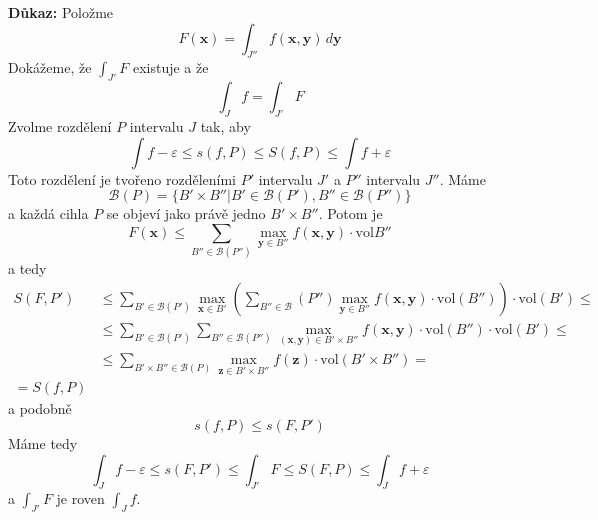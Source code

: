 \documentclass[../main.tex]{subfiles}
\begin{document}
\vspace{5mm}
\noindent
\textbf{Důkaz:}
Položme
\[ F(\mathbf{x}) = \int_{J''} f(\mathbf{x}, \mathbf{y}) \,d\mathbf{y} \]
Dokážeme, že $\int_{J'} F$ existuje a že
\[ \int_{J} f = \int_{J'} F \]
Zvolme rozdělení $P$ intervalu $J$ tak, aby
\[ \int f - \varepsilon \leq s(f,P) \leq S(f,P) \leq \int f + \varepsilon \]
Toto rozdělení je tvořeno rozděleními $P'$ intervalu $J'$ a $P''$ intervalu $J''$. Máme
\[ \mathcal{B}(P) = \{ B' \times B'' | B' \in \mathcal{B}(P'), B'' \in \mathcal{B}(P'') \} \]
a každá cihla $P$ se objeví jako právě jedno $B' \times B''$. Potom je
\[ F(\mathbf{x}) \leq \sum_{B''\in \mathcal{B}(P'')}
\max_{\mathbf{y} \in B''} f(\mathbf{x}, \mathbf{y}) \cdot \textrm{vol}B'' \]
a tedy
\begin{align*}
    S(F, P')
    &\leq \sum_{B' \in \mathcal{B}(P')} \max_{\mathbf{x}\in B'}
    \left( \sum_{B'' \in \mathcal{B}}(P'') \max_{\mathbf{y}\in B''}
    f(\mathbf{x}, \mathbf{y}) \cdot \textrm{vol}(B'')\right) \cdot \textrm{vol}(B') \leq\\
    &\leq \sum_{B' \in \mathcal{B}(P')} \sum_{B'' \in \mathcal{B}(P'')}
    \max_{(\mathbf{x}, \mathbf{y}) \in B' \times B''} f(\mathbf{x}, \mathbf{y})
    \cdot \textrm{vol}(B'') \cdot \textrm{vol}(B') \leq\\
    &\leq \sum_{B' \times B'' \in \mathcal{B}(P)} \max_{\mathbf{z}\in B' \times B''}
    f(\mathbf{z}) \cdot \textrm{vol}(B' \times B'') =\\
    = S(f,P)
\end{align*}
a podobně
\[ s(f,P) \leq s(F,P') \]
Máme tedy
\[ \int_{J} f - \varepsilon \leq s(F,P') \leq \int_{J'} F \leq S(F,P) \leq \int_{J} f + \varepsilon \]
a $\int_{J'} F$ je roven $\int_{J} f$.

\end{document}
